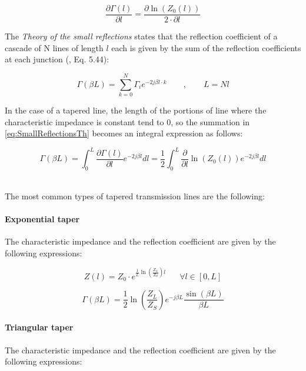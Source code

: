 \begin{equation}
  \frac{\partial \Gamma(l)}{ \partial l} = \frac{\partial \ln(Z_0(l))}{2 \cdot \partial l}
  \label{eq:DGammaDl}
\end{equation}

\noindent The \textit{Theory of the small reflections} states that the reflection coefficient of a cascade of N lines of length $l$ each is given by the sum of the reflection coefficients at each junction (\cite{Pozar}, Eq. 5.44):

\begin{equation}
\Gamma(\beta L) = \sum\limits_{k=0}^N \Gamma_i e^{-2j\beta l \cdot k} \qquad, \qquad L = Nl
\label{eq:SmallReflectionsTh}
\end{equation} 

\noindent In the case of a tapered line, the length of the portions of line where the characteristic impedance is constant tend to 0, so the summation in \ref{eq:SmallReflectionsTh} becomes an integral expression as follows:

\begin{equation}
\Gamma(\beta L) = \int_{0}^{L}  \frac{\partial \Gamma(l)}{\partial l} e^{-2j\beta l} dl = \frac{1}{2} \int_{0}^{L}  \frac{\partial}{\partial l} \ln \left( Z_0(l)\right) e^{-2j\beta l} dl
\label{eq:ReflectionCoeffGeneralTaper}
\end{equation}



\noindent \\The most common types of tapered transmission lines are the following:

\paragraph{Exponential taper}

The characteristic impedance and the reflection coefficient are given by the following expressions:

\begin{equation}
    Z(l) = Z_0 \cdot e^{\frac{1}{L} \ln \left(\frac{Z_L}{Z_S}\right) l} \;\;\;\;\;\; \forall l \in [0, L]
\end{equation}

\begin{equation}
    \Gamma(\beta L) = \frac{1}{2} \ln \left( \frac{Z_L}{Z_S} \right) e^{-j\beta L } \frac{\sin(\beta L)}{\beta L}
\end{equation}

\paragraph{Triangular taper}
The characteristic impedance and the reflection coefficient are given by the following expressions:

